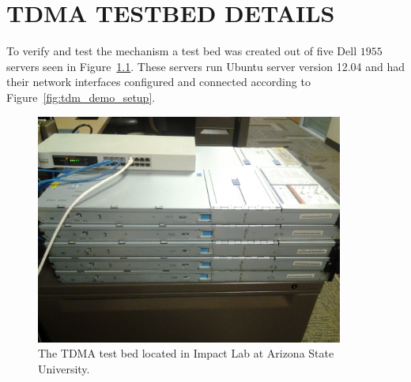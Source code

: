 \documentclass[oneside,12pt]{memoir}
\begin{document}
\chapter{TDMA TESTBED DETAILS}
\label{app:tdma_testbed}
To verify and test the mechanism a test bed was created out of five Dell $1955$ servers seen in Figure~\ref{fig:test_bed}. These servers run Ubuntu server version 12.04 and had their network interfaces configured and connected according to Figure~\ref{fig:tdm_demo_setup}.  

\begin{figure}
  \begin{center}
    \includegraphics[width=0.9\textwidth]{test_bed.jpg}
  \end{center}
  \caption{The TDMA test bed located in Impact Lab at Arizona State University.}
\label{fig:test_bed}
\end{figure}


\SingleSpace

\end{document}
